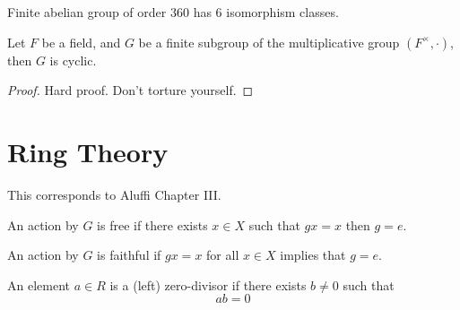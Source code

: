 \documentclass[openany]{book}
\begin{document}
\begin{example}
    Finite abelian group of order $360$ has $6$ isomorphism classes.
\end{example}


\begin{thm}
    Let $F$ be a field, and $G$ be a finite subgroup of the multiplicative group $(F^\times, \cdot)$, then $G$ is cyclic.
\end{thm}
\begin{proof}
    Hard proof. Don't torture yourself.
\end{proof}












































\chapter{Ring Theory}
This corresponds to Aluffi Chapter III.

\begin{defn}
    An action by $G$ is free if there exists $x\in X$ such that $gx=x$ then $g=e$.
\end{defn}

\begin{defn}
    An action by $G$ is faithful if $gx=x$ for all $x\in X$ implies that $g=e$.
\end{defn}


\begin{defn}
    An element $a\in R$ is a (left) zero-divisor if there exists $b\neq 0$ such that 
    \begin{equation*}
        ab=0
    \end{equation*}
\end{defn}
\end{document}
